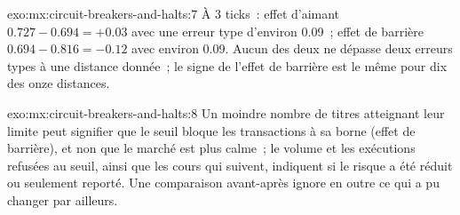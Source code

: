\begin{solution}{exo:mx:circuit-breakers-and-halts:7}
À 3 ticks~: effet d'aimant $0.727-0.694=+0.03$ avec une erreur type d'environ 0.09~; effet de barrière $0.694-0.816=-0.12$ avec environ 0.09. Aucun des deux ne dépasse deux
erreurs types à une distance donnée~; le signe de l'effet de barrière est le même pour dix des onze distances.
\end{solution}

\begin{solution}{exo:mx:circuit-breakers-and-halts:8}
Un moindre nombre de titres atteignant leur limite peut signifier que le seuil bloque les transactions à sa borne (effet de barrière), et non que le marché est plus calme~; le volume et les exécutions refusées
au seuil, ainsi que les cours qui suivent, indiquent si le risque a été réduit ou seulement reporté. Une comparaison avant-après ignore en outre ce qui a pu changer par ailleurs.
\end{solution}

